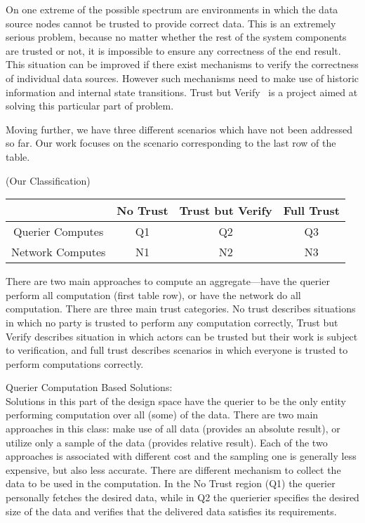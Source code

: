 \documentclass{article}
\begin{document}
On one extreme of the possible spectrum are environments in which the
data source nodes cannot be trusted to provide correct data. This is
an extremely serious problem, because no matter whether the rest of
the system components are trusted or not, it is impossible to ensure
any correctness of the end result. This situation can be improved if
there exist mechanisms to verify the correctness of individual data
sources. However such mechanisms need to make use of historic
information and internal state transitions. Trust but Verify~\cite{}
is a project aimed at solving this particular part of
problem.

Moving further, we have three different scenarios which have not been
addressed so far. Our work focuses on the scenario corresponding to
the last row of the table. 
  

(Our Classification)
\begin{table}[htpb!]
  \begin{tabular}{|c|c|c|c|}
    \hline
    & No Trust & Trust but Verify & Full Trust\\
    \hline
    Querier Computes & Q1 & Q2 & Q3\\
    Network Computes & N1 & N2 & N3\\
    \hline
  \end{tabular}
\end{table}

There are two main approaches to compute an aggregate---have the
querier perform all computation (first table row), or have the network do
all computation. There are three main trust categories. No trust
describes situations in which no party is trusted to perform any
computation correctly, Trust but Verify describes situation in which
actors can be trusted but their work is subject to verification, and
full trust describes scenarios in which everyone is trusted to perform
computations correctly.

Querier Computation Based Solutions:\\
Solutions in this part of the design space have the querier to be the
only entity performing computation over all (some) of the data. There
are two main approaches in this class: make use of all data (provides
an absolute result), or utilize only a sample of the data (provides
relative result). Each of the two approaches is associated with
different cost and the sampling one is generally less expensive, but
also less accurate. There are different mechanism to collect the data
to be used in the computation. In the No Trust region (Q1) the
querier personally fetches the desired data, while in Q2 the querierier
specifies the desired size of the data and verifies that the delivered
data satisfies its requirements. 
\end{document}
